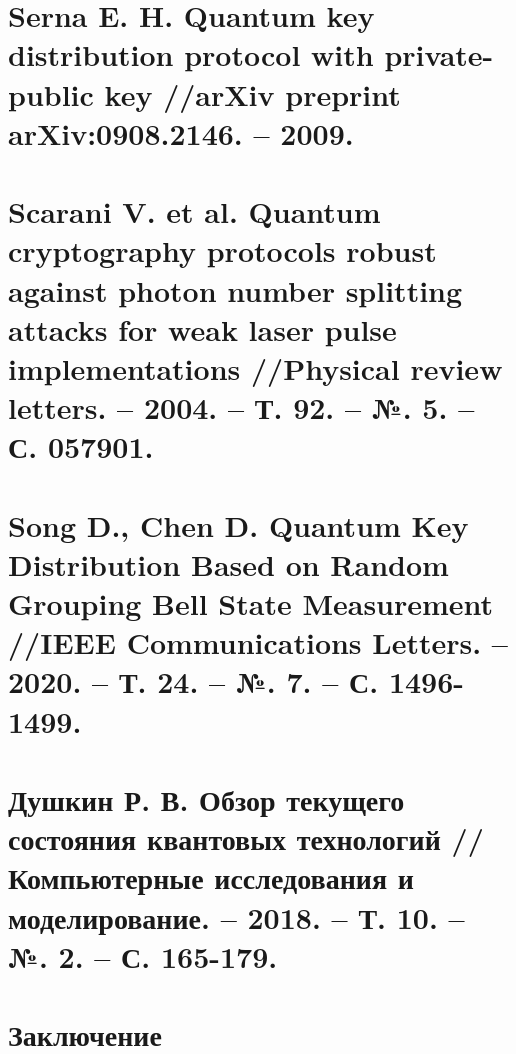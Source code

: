 \section{Serna E. H. Quantum key distribution protocol with private-public key //arXiv preprint arXiv:0908.2146. – 2009.}
\blindtext
\section{Scarani V. et al. Quantum cryptography protocols robust against photon number splitting attacks for weak laser pulse implementations //Physical review letters. – 2004. – Т. 92. – №. 5. – С. 057901.}
\blindtext
\section{Song D., Chen D. Quantum Key Distribution Based on Random Grouping Bell State Measurement //IEEE Communications Letters. – 2020. – Т. 24. – №. 7. – С. 1496-1499.}
\blindtext
\section{Душкин Р. В. Обзор текущего состояния квантовых технологий //Компьютерные исследования и моделирование. – 2018. – Т. 10. – №. 2. – С. 165-179.}

\section*{Заключение}
\blindtext


